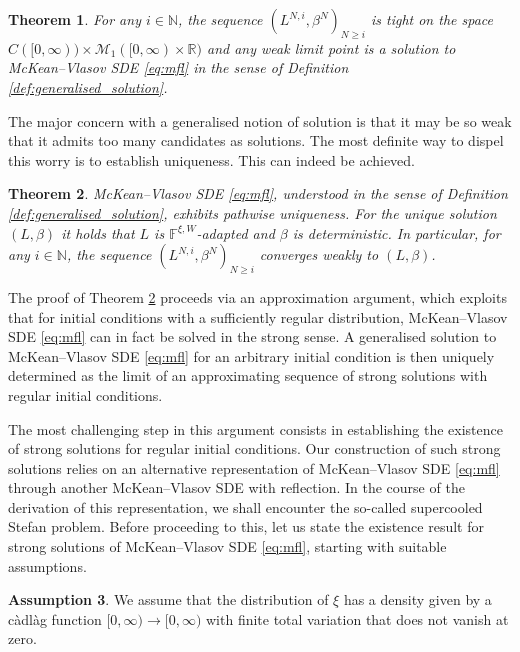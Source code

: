 \documentclass[11pt, a4paper]{article}
\theoremstyle{plain}
\newtheorem{theorem}{Theorem}[section]
\theoremstyle{definition}
\newtheorem{assumption}[theorem]{Assumption}
\theoremstyle{remark}
\numberwithin{equation}{section}
\newcommand{\R}{\mathbb{R}}
\newcommand{\bb}[1]{\mathbb{#1}}
\renewcommand{\cal}[1]{\mathcal{#1}}
\begin{document}
\begin{theorem} \label{thm:convergence}
For any $i \in \bb{N}$, the sequence $(L^{N, i}, \beta^N)_{N \geq i}$ is tight on the space $C([0, \infty)) \times \cal{M}_1([0, \infty) \times \R)$ and any weak limit point is a solution to McKean--Vlasov SDE \eqref{eq:mfl} in the sense of Definition \ref{def:generalised_solution}.
\end{theorem}

The major concern with a generalised notion of solution is that it may be so weak that it admits too many candidates as solutions. The most definite way to dispel this worry is to establish uniqueness. This can indeed be achieved.

\begin{theorem} \label{thm:unique_generalised}
McKean--Vlasov SDE \eqref{eq:mfl}, understood in the sense of Definition \ref{def:generalised_solution}, exhibits pathwise uniqueness. For the unique solution $(L, \beta)$ it holds that $L$ is $\bb{F}^{\xi, W}$-adapted and $\beta$ is deterministic. In particular, for any $i \in \bb{N}$, the sequence $(L^{N, i}, \beta^N)_{N \geq i}$ converges weakly to $(L, \beta)$.
\end{theorem}

The proof of Theorem \ref{thm:unique_generalised} proceeds via an approximation argument, which exploits that for initial conditions with a sufficiently regular distribution, McKean--Vlasov SDE \eqref{eq:mfl} can in fact be solved in the strong sense. A generalised solution to McKean--Vlasov SDE \eqref{eq:mfl} for an arbitrary initial condition is then uniquely determined as the limit of an approximating sequence of strong solutions with regular initial conditions. 

The most challenging step in this argument consists in establishing the existence of strong solutions for regular initial conditions. Our construction of such strong solutions relies on an alternative representation of McKean--Vlasov SDE \eqref{eq:mfl} through another McKean--Vlasov SDE with reflection. In the course of the derivation of this representation, we shall encounter the so-called supercooled Stefan problem. Before proceeding to this, let us state the existence result for strong solutions of McKean--Vlasov SDE \eqref{eq:mfl}, starting with suitable assumptions.

\begin{assumption} \label{ass:bounded_variation}
We assume that the distribution of $\xi$ has a density given by a c\`adl\`ag function $[0, \infty) \to [0, \infty)$ with finite total variation that does not vanish at zero.
\end{assumption}
\end{document}

